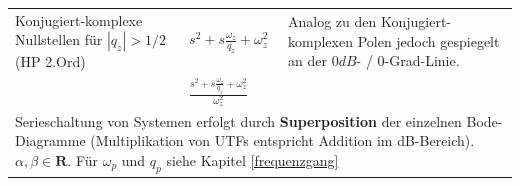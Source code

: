 \begin{landscape}
\begin{longtable}{|p{5cm}|l|ll|ll|}
		Konjugiert-komplexe Nullstellen
		für $|q_z| > 1/2$ (HP 2.Ord)&
		$s^2+s\frac{\omega_z}{q_z}+\omega_z^2$ &
		\multicolumn{4}{l|}{
			Analog zu den Konjugiert-komplexen Polen jedoch gespiegelt an der $0dB$- / $0$-Grad-Linie.
  		}
		\\
		&
		$\frac{s^2+s\frac{\omega_z}{q_z}+\omega_z^2}{\omega_z^2}$ &
		\multicolumn{4}{l|}{}
		\\ \hline
		\multicolumn{6}{|p{21cm}|}{
			Serieschaltung von Systemen erfolgt durch \textbf{Superposition} der einzelnen Bode-Diagramme 
			(Multiplikation von UTFs entspricht Addition im	dB-Bereich). $\alpha , \beta \in \mathbf{R}$. 
			Für $\omega_p$ und $q_p$ siehe Kapitel \ref{frequenzgang}
		}
		\\ \hline
	\end{longtable}
	\renewcommand{\arraystretch}{\arraystretchOriginal}
\end{landscape}
\clearpage
\twocolumn

